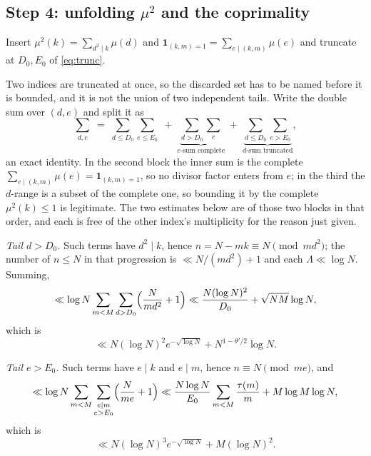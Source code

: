\documentclass[11pt,a4paper]{article}
\theoremstyle{plain}
\theoremstyle{definition}
\theoremstyle{remark}
\begin{document}
\subsection{Step 4: unfolding \texorpdfstring{$\mu^2$}{mu-squared} and the
coprimality}

Insert $\mu^2(k)=\sum_{d^2\mid k}\mu(d)$ and
$\mathbf 1_{(k,m)=1}=\sum_{e\mid(k,m)}\mu(e)$ and truncate at
$D_0,E_0$ of \eqref{eq:trunc}.

Two indices are truncated at once, so the discarded set has to be named
before it is bounded, and it is not the union of two independent tails.
Write the double sum over $(d,e)$ and split it as
\begin{equation}\label{eq:twotails}
  \sum_{d,e}\;=\;\sum_{d\le D_0}\sum_{e\le E_0}
  \;+\;\underbrace{\sum_{d>D_0}\sum_{e}}_{\text{$e$-sum complete}}
  \;+\;\underbrace{\sum_{d\le D_0}\sum_{e>E_0}}_{\text{$d$-sum truncated}},
\end{equation}
an exact identity. In the second block the inner sum is the complete
$\sum_{e\mid(k,m)}\mu(e)=\mathbf 1_{(k,m)=1}$, so no divisor factor
enters from $e$; in the third the $d$-range is a subset of the complete
one, so bounding it by the complete $\mu^2(k)\le1$ is legitimate. The
two estimates below are of those two blocks in that order, and each is
free of the other index's multiplicity for the reason just given.

\emph{Tail $d>D_0$.} Such terms have $d^2\mid k$, hence
$n=N-mk\equiv N\pmod{md^2}$; the number of $n\le N$ in that
progression is $\ll N/(md^2)+1$ and each $\Lambda\ll\log N$. Summing,
\[
  \ll\log N\sum_{m<M}\sum_{d>D_0}\Bigl(\frac{N}{md^2}+1\Bigr)
  \ll\frac{N(\log N)^2}{D_0}+\sqrt{NM}\log N,
\]
which is
\[
  \ll N(\log N)^2e^{-\sqrt{\log N}}+N^{1-\theta'/2}\log N.
\]

\emph{Tail $e>E_0$.} Such terms have $e\mid k$ and $e\mid m$, hence
$n\equiv N\pmod{me}$, and
\[
  \ll\log N\sum_{m<M}\sum_{\substack{e\mid m\\ e>E_0}}
      \Bigl(\frac{N}{me}+1\Bigr)
  \ll\frac{N\log N}{E_0}\sum_{m<M}\frac{\tau(m)}{m}+M\log M\log N,
\]
which is
\[
  \ll N(\log N)^{3}e^{-\sqrt{\log N}}+M(\log N)^2 .
\]
\end{document}
